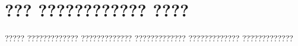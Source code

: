 \documentclass[11pt,catalan,listoffigures,listoftables]{tfgetsinf}
\begin{document}

\APPENDIX

\chapter{??? ???????????? ????}

????? ????????????? ????????????? ????????????? ????????????? ????????????? 



\end{document}
